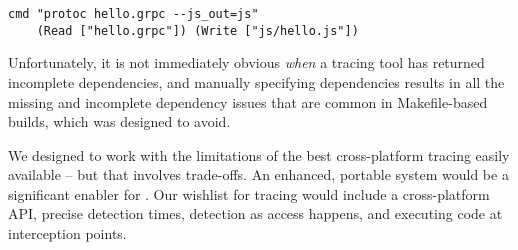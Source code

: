 \begin{verbatim}
cmd "protoc hello.grpc --js_out=js"
    (Read ["hello.grpc"]) (Write ["js/hello.js"])
\end{verbatim}

Unfortunately, it is not immediately obvious \emph{when} a tracing tool has returned incomplete dependencies, and manually specifying dependencies results in all the missing and incomplete dependency issues that are common in Makefile-based builds, which \Rattle was designed to avoid.

\vspace{2mm}




We designed \Rattle to work with the limitations of the best cross-platform tracing easily available -- but that involves trade-offs. An enhanced, portable system would be a significant enabler for \Rattle.
Our wishlist for tracing would include a cross-platform API, precise detection times, detection as access happens, and executing code at interception points.

